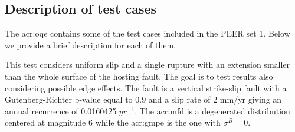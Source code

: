 \subsection{Description of test cases}
The \gls{acr:oqe} contains some of the test cases included in the PEER set 1.
Below we provide a brief description for each of them.
\begin{description}
    \clearpage
    \item [Test case 2] 
        This test considers uniform slip and a 
        single rupture with an extension smaller than the whole surface 
        of the hosting fault. The goal is to test results also considering
        possible edge effects. 
        The fault is a vertical strike-slip fault with a Gutenberg-Richter
        b-value equal to 0.9 and a slip rate of 2 mm/yr giving an annual 
        recurrence of 0.0160425 $yr^{-1}$. 
        The \gls{acr:mfd} is a degenerated distribution centered at 
        magnitude 6 while the \gls{acr:gmpe} is the \textcite{sadigh1997} 
        one with $\sigma^B=0$.


\end{description}
